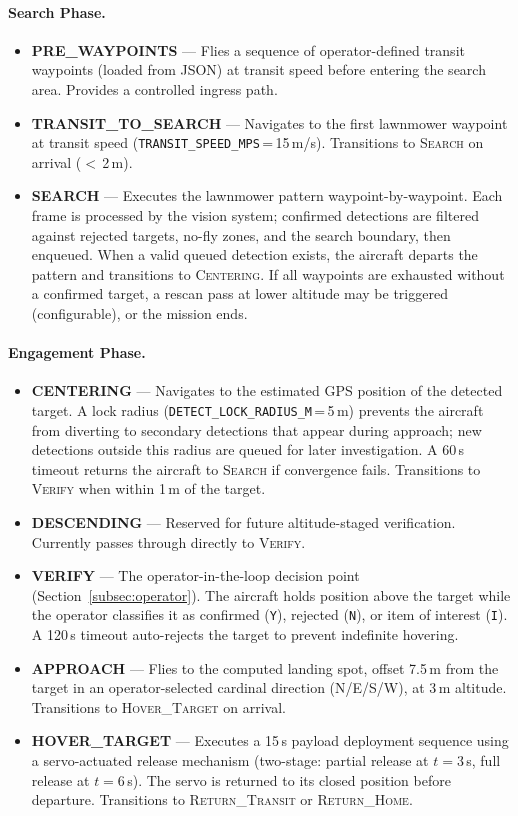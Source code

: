 \paragraph{Search Phase.}
\begin{itemize}
    \item \textbf{PRE\_WAYPOINTS} --- Flies a sequence of operator-defined transit waypoints (loaded from JSON) at transit speed before entering the search area. Provides a controlled ingress path.
    \item \textbf{TRANSIT\_TO\_SEARCH} --- Navigates to the first lawnmower waypoint at transit speed (\texttt{TRANSIT\_SPEED\_MPS}\,=\,15\,m/s). Transitions to \textsc{Search} on arrival ($<$\,2\,m).
    \item \textbf{SEARCH} --- Executes the lawnmower pattern waypoint-by-waypoint. Each frame is processed by the vision system; confirmed detections are filtered against rejected targets, no-fly zones, and the search boundary, then enqueued. When a valid queued detection exists, the aircraft departs the pattern and transitions to \textsc{Centering}. If all waypoints are exhausted without a confirmed target, a rescan pass at lower altitude may be triggered (configurable), or the mission ends.
\end{itemize}

\paragraph{Engagement Phase.}
\begin{itemize}
    \item \textbf{CENTERING} --- Navigates to the estimated GPS position of the detected target. A lock radius (\texttt{DETECT\_LOCK\_RADIUS\_M}\,=\,5\,m) prevents the aircraft from diverting to secondary detections that appear during approach; new detections outside this radius are queued for later investigation. A 60\,s timeout returns the aircraft to \textsc{Search} if convergence fails. Transitions to \textsc{Verify} when within 1\,m of the target.
    \item \textbf{DESCENDING} --- Reserved for future altitude-staged verification. Currently passes through directly to \textsc{Verify}.
    \item \textbf{VERIFY} --- The operator-in-the-loop decision point (Section~\ref{subsec:operator}). The aircraft holds position above the target while the operator classifies it as confirmed (\texttt{Y}), rejected (\texttt{N}), or item of interest (\texttt{I}). A 120\,s timeout auto-rejects the target to prevent indefinite hovering.
    \item \textbf{APPROACH} --- Flies to the computed landing spot, offset 7.5\,m from the target in an operator-selected cardinal direction (N/E/S/W), at 3\,m altitude. Transitions to \textsc{Hover\_Target} on arrival.
    \item \textbf{HOVER\_TARGET} --- Executes a 15\,s payload deployment sequence using a servo-actuated release mechanism (two-stage: partial release at $t=3$\,s, full release at $t=6$\,s). The servo is returned to its closed position before departure. Transitions to \textsc{Return\_Transit} or \textsc{Return\_Home}.
\end{itemize}

